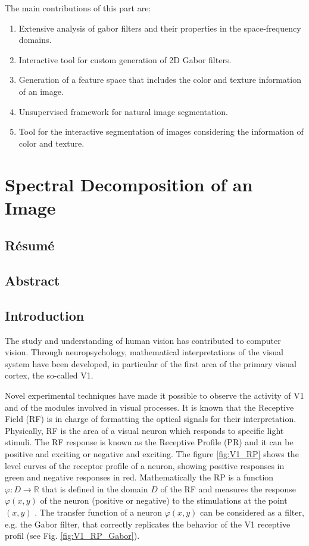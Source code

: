 The main contributions of this part are:
\begin{enumerate}
	\item Extensive analysis of gabor filters and their properties in the space-frequency domains.
	\item Interactive tool for custom generation of 2D Gabor filters.
	\item Generation of a feature space that includes the color and texture information of an image.
	\item Unsupervised framework for natural image segmentation.
	\item Tool for the interactive segmentation of images considering the information of color and texture.
\end{enumerate}

\chapter{Spectral Decomposition of an Image}\label{ch:spectral_image_decomposition}

\section*{Résumé}
\noindent 

\section*{Abstract}
\noindent 

\section{Introduction}

The study and understanding of human vision has contributed to computer vision. Through neuropsychology, mathematical interpretations of the visual system have been developed, in particular of the first area of the primary visual cortex, the so-called V1.

Novel experimental techniques \citep{DeAngelis.Ohzawa.ea:TN:1995} have made it possible to observe the activity of V1 and of the modules involved in visual processes. It is known that the Receptive Field (RF) is in charge of formatting the optical signals for their interpretation. Physically, RF is the area of a visual neuron which responds to specific light stimuli. The RF response is known as the Receptive Profile (PR) and it can be positive and exciting or negative and exciting. The figure \ref{fig:V1_RP} shows the level curves of the receptor profile of a neuron, showing positive responses in green and negative responses in red.
Mathematically the RP is a function $\varphi:  D \rightarrow \mathbb{R}$ that is defined in the domain $D$ of the RF and measures the response $\varphi(x,y)$ of the neuron (positive or negative) to the stimulations at the point $(x,y)$ \citep{Petitot:Neurogeometrie:2008}.
The transfer function of a neuron $\varphi(x,y)$ can be considered as a filter, e.g. the Gabor filter, that correctly replicates the behavior of the V1 receptive profil (see Fig. \ref{fig:V1_RP_Gabor}).

